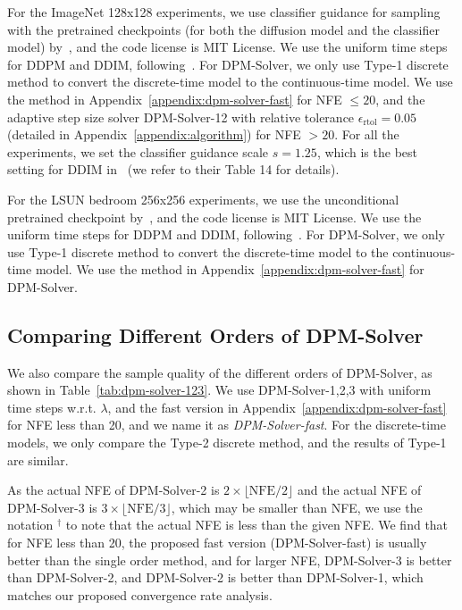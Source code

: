 For the ImageNet 128x128 experiments, we use classifier guidance for sampling with the pretrained checkpoints (for both the diffusion model and the classifier model) by~\citep{dhariwal2021diffusion}, and the code license is MIT License. We use the uniform time steps for DDPM and DDIM, following~\citep{song2020denoising}. For DPM-Solver, we only use Type-1 discrete method to convert the discrete-time model to the continuous-time model. We use the method in Appendix~\ref{appendix:dpm-solver-fast} for NFE $\leq 20$, and the adaptive step size solver DPM-Solver-12 with relative tolerance $\epsilon_{\text{rtol}}=0.05$ (detailed in Appendix~\ref{appendix:algorithm}) for NFE $> 20$. For all the experiments, we set the classifier guidance scale $s=1.25$, which is the best setting for DDIM in~\citep{dhariwal2021diffusion} (we refer to their Table 14 for details).

For the LSUN bedroom 256x256 experiments, we use the unconditional pretrained checkpoint by~\citep{dhariwal2021diffusion}, and the code license is MIT License. We use the uniform time steps for DDPM and DDIM, following~\citep{song2020denoising}. For DPM-Solver, we only use Type-1 discrete method to convert the discrete-time model to the continuous-time model. We use the method in Appendix~\ref{appendix:dpm-solver-fast} for DPM-Solver.















\subsection{Comparing Different Orders of DPM-Solver}
We also compare the sample quality of the different orders of DPM-Solver, as shown in Table~\ref{tab:dpm-solver-123}. We use DPM-Solver-1,2,3 with uniform time steps w.r.t. $\lambda$, and the fast version in Appendix~\ref{appendix:dpm-solver-fast} for NFE less than 20, and we name it as \textit{DPM-Solver-fast}. For the discrete-time models, we only compare the Type-2 discrete method, and the results of Type-1 are similar.

As the actual NFE of DPM-Solver-2 is $2\times\lfloor\text{NFE}/2\rfloor$ and the actual NFE of DPM-Solver-3 is $3\times\lfloor\text{NFE}/3\rfloor$, which may be smaller than NFE, we use the notation $^\dagger$ to note that the actual NFE is less than the given NFE. We find that for NFE less than 20, the proposed fast version (DPM-Solver-fast) is usually better than the single order method, and for larger NFE, DPM-Solver-3 is better than DPM-Solver-2, and DPM-Solver-2 is better than DPM-Solver-1, which matches our proposed convergence rate analysis.

